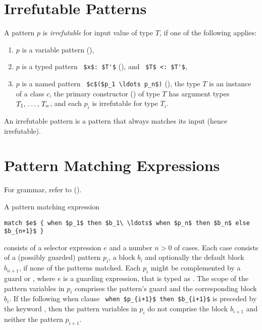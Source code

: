 \section{Irrefutable Patterns}
\label{sec:irrefutable-patterns}

A pattern $p$ is {\em irrefutable} for input value of type $T$, if one of the following applies: 
\begin{enumerate}
  \item $p$ is a variable pattern (),
  \item $p$ is a typed pattern ~\lstinline!$x$: $T'$! (), and ~\lstinline!$T$ <: $T'$!,
  \item $p$ is a named pattern ~\lstinline!$c$($p_1 \ldots p_n$)! (), the type $T$ is an instance of a class $c$, the primary constructor () of type $T$ has argument types $T_1 ,\, \ldots ,\, T_n$, and each $p_i$ is irrefutable for type $T_i$. 
\end{enumerate}

An irrefutable pattern is a pattern that always matches its input (hence irrefutable). 





\section{Pattern Matching Expressions}

For grammar, refer to ().

A pattern matching expression 
\begin{lstlisting}
match $e$ { when $p_1$ then $b_1\ \ldots$ when $p_n$ then $b_n$ else $b_{n+1}$ }
\end{lstlisting}
consists of a selector expression $e$ and a number $n > 0$ of cases. Each case consists of a (possibly guarded) pattern $p_i$, a block $b_i$ and optionally the default block $b_{n+1}$, if none of the patterns matched. Each $p_i$ might be complemented by a guard  or , where $e$ is a guarding expression, that is typed as . The scope of the pattern variables in $p_i$ comprises the pattern's guard and the corresponding block $b_i$. If the following when clause ~\lstinline!when $p_{i+1}$ then $b_{i+1}$! is preceded by the keyword , then the pattern variables in $p_i$ do not comprise the block $b_{i+1}$ and neither the pattern $p_{i+1}$. 

